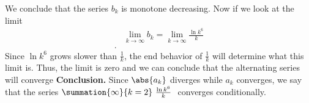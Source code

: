 \documentclass{report}
\begin{document}
    \bigbreak \noindent 
    We conclude that the series $b_{k}$ is monotone decreasing. Now if we look at the limit
    \begin{align*}
        &\lim\limits_{k \to \infty}{b_{k}} = \lim\limits_{k \to \infty}{\frac{\ln{k^{6}}}{k}} \\
    .\end{align*}
    \bigbreak \noindent 
    Since $\ln{k^{6}}$ grows slower than $\frac{1}{k}$, the end behavior of $\frac{1}{k}$ will determine what this limit is. Thus, the limit is zero and we can conclude that the alternating series will converge
    \bigbreak \noindent 
    \textbf{Conclusion.} Since $\abs{a_{k}}$ diverges while $a_{k}$ converges, we say that the series $\summation{\infty}{k=2}\ \frac{\ln{k^{6}}}{k}\  $ converges conditionally.




    
\end{document}
